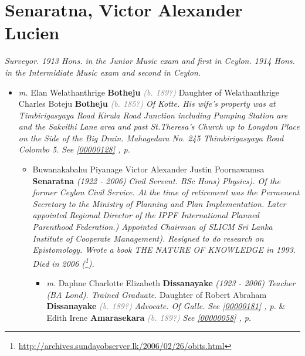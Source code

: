 \documentclass[10pt, openany]{book}
\begin{document}
\chapter{Senaratna, Victor Alexander Lucien}
\label{00000778}
\textcolor{slmaroon}{\textit{Surveyor.
1913 Hons. in the Junior Music exam and first in Ceylon. 1914 Hons. in the Intermidiate Music exam and second in Ceylon.}}
\begin{itemize}
\item{\textit{m.} Elan Welathanthrige \textbf{Botheju} \textcolor{gray}{\textit{(b. 189?)}} Daughter of  Welathanthrige Charles Boteju \textbf{Botheju} \textcolor{gray}{\textit{(b. 185?)}} \textcolor{slmaroon}{\textit{Of Kotte. His wife's property was at Timbirigasyaya Road Kirula Road Junction including Pumping Station are and the Sakvithi Lane area and past St.Theresa's Church up to Longdon Place on the Side of the Big Drain. Mahagedara No. 245 Thimbirigasyaya Road Colombo 5.}} \textcolor{slteal}{\textit{See  \autoref{00000128} \textit{, p. \pageref{00000128} }}}   \label{couple:00000127:00000778} \begin{itemize}
\item{Buwanakabahu Piyanage Victor Alexander Justin Poornawamsa \textbf{Senaratna} \textcolor{slorange}{\textit{(1922 - 2006)}} \textcolor{slmaroon}{\textit{Civil Servent.
BSc Hons) Physics).
Of the former Ceylon Civil Service. At the time of retirement was the Permenent Secretary to the Ministry of Planning and Plan Implementation. Later appointed Regional Director of the IPPF International Planned Parenthood Federation.) Appointed Chairman of SLICM Sri Lanka Institute of Cooperate Management). Resigned to do research on Epistomology. Wrote a book THE NATURE OF KNOWLEDGE in 1993.
Died in 2006 (\footnote{\url{http://archives.sundayobserver.lk/2006/02/26/obits.html}}).}}
\begin{itemize}
\item{\textit{m.} Daphne Charlotte Elizabeth \textbf{Dissanayake} \textcolor{slorange}{\textit{(1923 - 2006)}} \textcolor{slmaroon}{\textit{Teacher (BA Lond). Trained Graduate.}} Daughter of  Robert Abraham \textbf{Dissanayake} \textcolor{gray}{\textit{(b. 189?)}} \textcolor{slmaroon}{\textit{Advocate.
Of Galle.}} \textcolor{slteal}{\textit{See  \autoref{00000181} \textit{, p. \pageref{00000181} }}}  \&  Edith Irene \textbf{Amarasekara} \textcolor{gray}{\textit{(b. 189?)}} \textcolor{slteal}{\textit{See  \autoref{00000058} \textit{, p. \pageref{00000058} }}}   \label{couple:00000179:00000712} \begin{itemize}

\end{itemize}}
\end{itemize}}
\end{itemize}}
\end{itemize}
\end{document}
